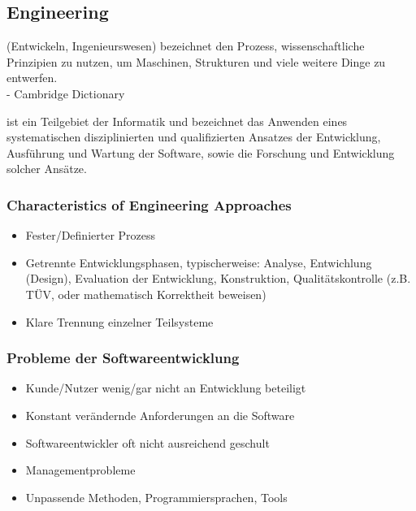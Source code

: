 \documentclass[
    ngerman,
    color=3b,
    summary,
    boxarc,
    main,
]{rubos-tuda-template}
\begin{document}
\subsection{Engineering}
\begin{definition}[Engineering]
    (Entwickeln, Ingenieurswesen) bezeichnet den Prozess, wissenschaftliche Prinzipien zu nutzen, um Maschinen, Strukturen und viele weitere Dinge zu entwerfen.\\
    \phantom{a}\hfill - Cambridge Dictionary
\end{definition}
\begin{definition}
    ist ein Teilgebiet der Informatik und bezeichnet das Anwenden eines systematischen disziplinierten und qualifizierten Ansatzes der Entwicklung, Ausführung und Wartung der Software, sowie die Forschung und Entwicklung solcher Ansätze.
\end{definition}
\subsubsection{Characteristics of Engineering Approaches}
\begin{itemize}
    \item Fester/Definierter Prozess
    \item Getrennte Entwicklungsphasen, typischerweise: Analyse, Entwichlung (Design), Evaluation der Entwicklung, Konstruktion, Qualitätskontrolle (z.B. TÜV, oder mathematisch Korrektheit beweisen)
    \item Klare Trennung einzelner Teilsysteme
\end{itemize}
\subsubsection{Probleme der Softwareentwicklung}
\begin{itemize}
    \item Kunde/Nutzer wenig/gar nicht an Entwicklung beteiligt
    \item Konstant verändernde Anforderungen an die Software
    \item Softwareentwickler oft nicht ausreichend geschult
    \item Managementprobleme
    \item Unpassende Methoden, Programmiersprachen, Tools
\end{itemize}
\clearpage
\end{document}
